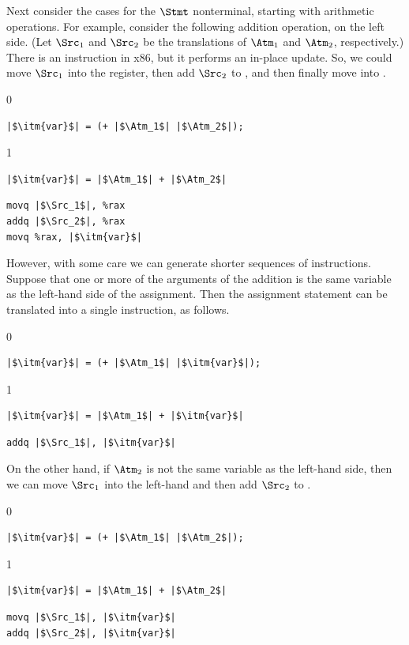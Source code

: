 \documentclass[7x10]{TimesAPriori_MIT}%
\def\racketEd{0}
\def\pythonEd{1}
\providecommand{\BookEdition}{1}
\let\edition\BookEdition
\newcommand{\pythonColor}[0]{}
\numberwithin{theorem}{chapter}
\numberwithin{definition}{chapter}
\numberwithin{equation}{chapter}
\begin{document}
Next consider the cases for the $\Stmt$ nonterminal, starting with
arithmetic operations. For example, consider the following addition
operation, on the left side.  (Let $\Src_1$ and $\Src_2$ be the
translations of $\Atm_1$ and $\Atm_2$, respectively.)  There is an
 instruction in x86, but it performs an in-place update.
%
So, we could move $\Src_1$ into the  register, then add
$\Src_2$ to , and then finally move  into . 
\begin{transformation}
{\if\edition\racketEd    
\begin{lstlisting}
|$\itm{var}$| = (+ |$\Atm_1$| |$\Atm_2$|);
\end{lstlisting}
\fi}
{\if\edition\pythonEd\pythonColor
\begin{lstlisting}
|$\itm{var}$| = |$\Atm_1$| + |$\Atm_2$|
\end{lstlisting}
\fi}
\compilesto
\begin{lstlisting}
movq |$\Src_1$|, %rax
addq |$\Src_2$|, %rax
movq %rax, |$\itm{var}$|
\end{lstlisting}
\end{transformation}
%
However, with some care we can generate shorter sequences of
instructions. Suppose that one or more of the arguments of the
addition is the same variable as the left-hand side of the assignment.
Then the assignment statement can be translated into a single
 instruction, as follows.
\begin{transformation}
{\if\edition\racketEd
\begin{lstlisting}
|$\itm{var}$| = (+ |$\Atm_1$| |$\itm{var}$|);
\end{lstlisting}
\fi}
{\if\edition\pythonEd\pythonColor
\begin{lstlisting}
|$\itm{var}$| = |$\Atm_1$| + |$\itm{var}$|
\end{lstlisting}
\fi}    
\compilesto
\begin{lstlisting}
addq |$\Src_1$|, |$\itm{var}$|
\end{lstlisting}
\end{transformation}
%
On the other hand, if $\Atm_2$ is not the same variable as the
left-hand side, then we can move $\Src_1$ into the left-hand 
and then add $\Src_2$ to .
%
\begin{transformation}
{\if\edition\racketEd    
\begin{lstlisting}
|$\itm{var}$| = (+ |$\Atm_1$| |$\Atm_2$|);
\end{lstlisting}
\fi}
{\if\edition\pythonEd\pythonColor
\begin{lstlisting}
|$\itm{var}$| = |$\Atm_1$| + |$\Atm_2$|
\end{lstlisting}
\fi}
\compilesto
\begin{lstlisting}
movq |$\Src_1$|, |$\itm{var}$|
addq |$\Src_2$|, |$\itm{var}$|
\end{lstlisting}
\end{transformation}
\end{document}
